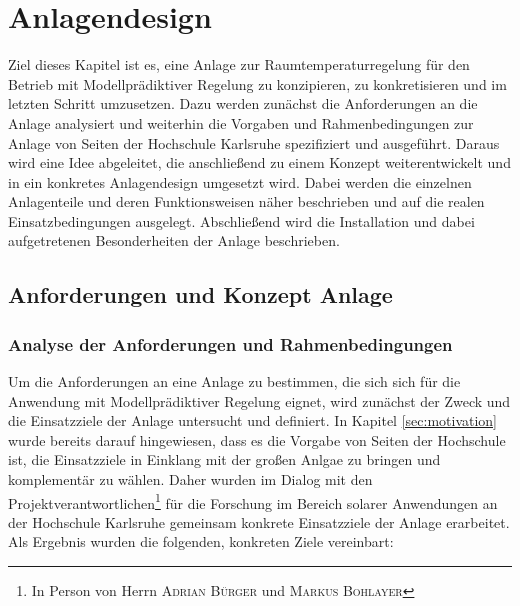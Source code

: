 %
%

\renewcommand{\chapterheadstartvskip}{\vspace*{2cm}}

\chapter{Anlagendesign}
\label{chap:anlagendesign}

\renewcommand{\chapterheadstartvskip}{\vspace*{-0.5cm}}

Ziel dieses Kapitel ist es, eine Anlage zur Raumtemperaturregelung für den Betrieb mit Modellprädiktiver Regelung zu konzipieren, zu konkretisieren und im letzten Schritt umzusetzen. Dazu werden zunächst die Anforderungen an die Anlage analysiert und weiterhin die Vorgaben und Rahmenbedingungen zur Anlage von Seiten der Hochschule Karlsruhe spezifiziert und ausgeführt. Daraus wird eine Idee abgeleitet, die anschließend zu einem Konzept weiterentwickelt und in ein konkretes Anlagendesign umgesetzt wird. Dabei werden die einzelnen Anlagenteile und deren Funktionsweisen näher beschrieben und auf die realen Einsatzbedingungen ausgelegt. Abschließend wird die Installation und dabei aufgetretenen Besonderheiten der Anlage beschrieben.

\section{Anforderungen und Konzept Anlage}


\subsection{Analyse der Anforderungen und Rahmenbedingungen}
\label{sec:anforderungen}

Um die Anforderungen an eine Anlage zu bestimmen, die sich sich für die Anwendung mit Modellprädiktiver Regelung eignet, wird zunächst der Zweck und die Einsatzziele der Anlage untersucht und definiert. In Kapitel \ref{sec:motivation} wurde bereits darauf hingewiesen, dass es die Vorgabe von Seiten der Hochschule ist, die Einsatzziele in Einklang mit der großen Anlgae zu bringen und komplementär zu wählen. Daher wurden im Dialog mit den Projektverantwortlichen\footnote{In Person von Herrn \textsc{Adrian Bürger} und \textsc{Markus Bohlayer}} für die Forschung im Bereich solarer Anwendungen an der Hochschule Karlsruhe gemeinsam konkrete Einsatzziele der Anlage erarbeitet. Als Ergebnis wurden die folgenden, konkreten Ziele vereinbart:
 
